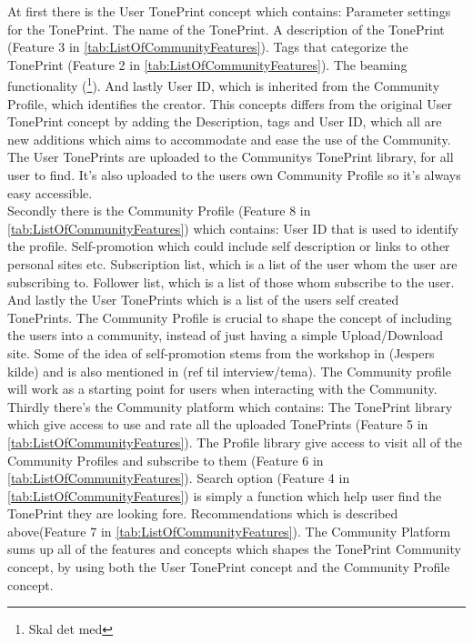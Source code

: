 At first there is the User TonePrint concept which contains: Parameter settings for the TonePrint. The name of the TonePrint. A description of the TonePrint (Feature 3 in \autoref{tab:ListOfCommunityFeatures}). Tags that categorize the TonePrint (Feature 2 in \autoref{tab:ListOfCommunityFeatures}). The beaming functionality (\footnote{Skal det med}). And lastly User ID, which is inherited from the Community Profile, which identifies the creator. This concepts differs from the original User TonePrint concept by adding the Description, tags and User ID, which all are new additions which aims to accommodate and ease the use of the Community. The User TonePrints are uploaded to the Communitys TonePrint library, for all user to find. It's also uploaded to the users own Community Profile so it's always easy accessible.\\
Secondly there is the Community Profile (Feature 8 in \autoref{tab:ListOfCommunityFeatures}) which contains: User ID that is used to identify the profile. Self-promotion which could include self description or links to other personal sites etc. Subscription list, which is a list of the user whom the user are subscribing to. Follower list, which is a list of those whom subscribe to the user. And lastly the User TonePrints which is a list of the users self created TonePrints. The Community Profile is crucial to shape the concept of including the users into a community, instead of just having a simple Upload/Download site. Some of the idea of self-promotion stems from the workshop in (Jespers kilde) and is also mentioned in (ref til interview/tema). The Community profile will work as a starting point for users when interacting with the Community.\\
Thirdly there's the Community platform which contains: The TonePrint library which give access to use and rate all the uploaded TonePrints (Feature 5 in \autoref{tab:ListOfCommunityFeatures}). The Profile library give access to visit all of the Community Profiles and subscribe to them (Feature 6 in \autoref{tab:ListOfCommunityFeatures}). Search option (Feature 4 in \autoref{tab:ListOfCommunityFeatures}) is simply a function which help user find the TonePrint they are looking fore. Recommendations which is described above(Feature 7 in \autoref{tab:ListOfCommunityFeatures}). The Community Platform sums up all of the features and concepts which shapes the TonePrint Community concept, by using both the User TonePrint concept and the Community Profile concept.\\
